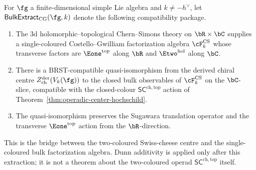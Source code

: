 \begin{definition}
\label{def:cg-bulk-extraction-package}
For $\fg$ a finite-dimensional simple Lie algebra and
$k\neq -h^\vee$, let
$\mathsf{BulkExtract}_{\mathrm{CG}}(\fg,k)$ denote the following
compatibility package.
\begin{enumerate}[label=\textup{(\roman*)}]
\item The $3$d holomorphic--topological Chern--Simons theory on
 $\bR\times\bC$ supplies a single-coloured
 Costello--Gwilliam factorization algebra
 $\cF^{\mathrm{CS}}_k$ whose transverse factors are
 $\Eone^{\mathrm{top}}$ along $\bR$ and
 $\Etwo^{\mathrm{hol}}$ along $\bC$.
\item There is a BRST-compatible quasi-isomorphism from the
 derived chiral centre
 $Z^{\mathrm{der}}_{\mathrm{ch}}(V_k(\fg))$ to the closed
 bulk observables of $\cF^{\mathrm{CS}}_k$ on the $\bC$-slice,
 compatible with the closed-colour
 $\mathsf{SC}^{\mathrm{ch,top}}$ action of
 Theorem~\ref{thm:operadic-center-hochschild}.
\item The quasi-isomorphism preserves the Sugawara translation
 operator and the transverse $\Eone^{\mathrm{top}}$ action from
 the $\bR$-direction.
\end{enumerate}
This is the bridge between the two-coloured Swiss-cheese centre
and the single-coloured bulk factorization algebra. Dunn
additivity is applied only after this extraction; it is not a
theorem about the two-coloured operad
$\mathsf{SC}^{\mathrm{ch,top}}$ itself.
\end{definition}

